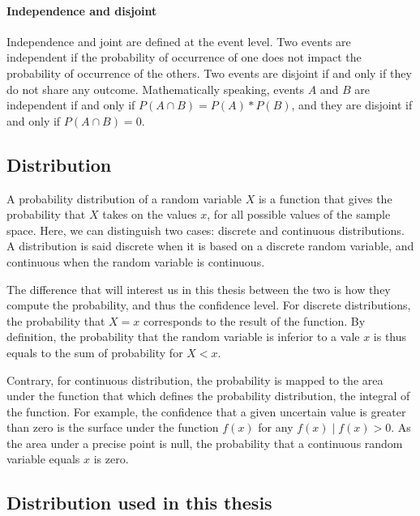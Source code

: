 \paragraph{Independence and disjoint}
Independence and joint are defined at the event level.
Two events are independent if the probability of occurrence of one does not impact the probability of occurrence of the others.
Two events are disjoint if and only if they do not share any outcome.
Mathematically speaking, events $A$ and $B$ are independent if and only if $P(A \cap B) = P(A) * P(B)$, and they are disjoint if and only if $P(A \cap B) = 0$.

\subsection{Distribution}
A probability distribution of a random variable $X$ is a function that gives the probability that $X$ takes on the values $x$, for all possible values of the sample space.
Here, we can distinguish two cases: discrete and continuous distributions.
A distribution is said discrete when it is based on a discrete random variable, and continuous when the random variable is continuous.

The difference that will interest us in this thesis between the two is how they compute the probability, and thus the confidence level.
For discrete distributions, the probability that $X=x$ corresponds to the result of the function.
By definition, the probability that the random variable is inferior to a vale $x$ is thus equals to the sum of probability for $X < x$.

Contrary, for continuous distribution, the probability is mapped to the area under the function that which defines the probability distribution, \ie the integral of the function.
For example, the confidence that a given uncertain value is greater than zero is the surface under the function $f(x)$ for any $f(x) \mid f(x) > 0$. 
As the area under a precise point is null, the probability that a continuous random variable equals $x$ is zero.


\subsection{Distribution used in this thesis}

